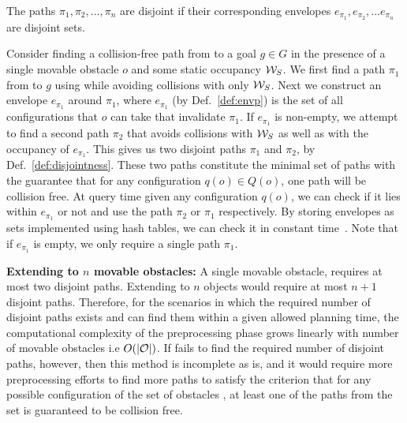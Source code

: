 \documentclass[a4paper]{report}
\begin{document}
\begin{definition}
\label{def:disjointness}
The paths $\pi_1,\pi_2,...,\pi_n$ are disjoint if their corresponding envelopes $e_{\pi_1},e_{\pi_2},...e_{\pi_n}$ are disjoint sets.
\end{definition}

Consider finding a collision-free path from \Sstart to a goal $g \in G$ in the presence of a single movable obstacle $o$ and some static occupancy $\mathcal{W}_S$.
We first find a path $\pi_1$ from \Sstart to $g$ using \calP while avoiding collisions with only $\mathcal{W}_S$.
Next we construct an envelope $e_{\pi_1}$ around $\pi_1$, where $e_{\pi_1}$ (by Def.~\ref{def:envp}) is the set of all configurations that $o$ can take that invalidate $\pi_1$.
If $e_{\pi_1}$ is non-empty, we attempt to find a second path $\pi_2$ that avoids collisions with $\mathcal{W}_S$ as well as with the occupancy of $e_{\pi_1}$.
This gives us two disjoint paths $\pi_1$ and $\pi_2$, by Def.~\ref{def:disjointness}.
These two paths constitute the minimal set of paths with the guarantee that for any configuration $q(o) \in Q(o)$, one path will be collision free.
At query time given any configuration $q(o)$, we can check if it lies within $e_{\pi_1}$ or not and use the path $\pi_2$ or $\pi_1$ respectively. By storing envelopes as sets implemented using hash tables, we can check it in constant time~\cite{czech1997perfect}. Note that if $e_{\pi_1}$ is empty, we only require a single path $\pi_1$.

\textbf{Extending to $n$ movable obstacles:} A single movable obstacle, requires at most two disjoint paths. Extending to $n$ objects would require at most $n+1$ disjoint paths. Therefore, for the scenarios in which the required number of disjoint paths exists and \calP can find them within a given allowed planning time, the computational complexity of the preprocessing phase grows linearly with number of movable obstacles i.e $O(|\mathcal{O}|)$.
If \calP fails to find the required number of disjoint paths, however,
then this method is incomplete as is, and it would require more preprocessing efforts to find more paths to satisfy the criterion that for any possible configuration of the set of obstacles \calO, at least one of the paths from the set is guaranteed to be collision free. %
\end{document}
